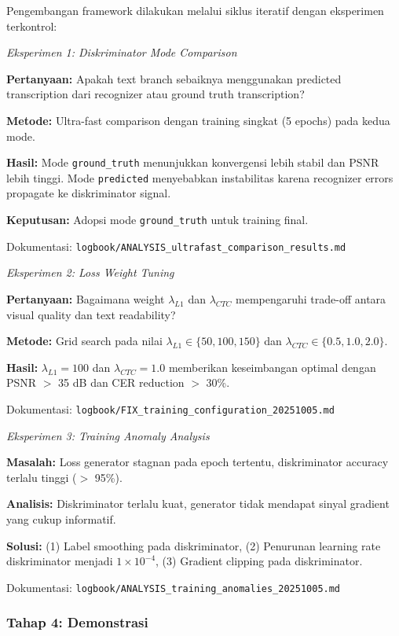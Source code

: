 \documentclass[12pt,a4paper]{article}
\begin{document}
Pengembangan framework dilakukan melalui siklus iteratif dengan eksperimen terkontrol:

\textit{Eksperimen 1: Diskriminator Mode Comparison}

\textbf{Pertanyaan:} Apakah text branch sebaiknya menggunakan predicted transcription dari recognizer atau ground truth transcription?

\textbf{Metode:} Ultra-fast comparison dengan training singkat (5 epochs) pada kedua mode.

\textbf{Hasil:} Mode \texttt{ground\_truth} menunjukkan konvergensi lebih stabil dan PSNR lebih tinggi. Mode \texttt{predicted} menyebabkan instabilitas karena recognizer errors propagate ke diskriminator signal.

\textbf{Keputusan:} Adopsi mode \texttt{ground\_truth} untuk training final.

Dokumentasi: \texttt{logbook/ANALYSIS\_ultrafast\_comparison\_results.md}

\textit{Eksperimen 2: Loss Weight Tuning}

\textbf{Pertanyaan:} Bagaimana weight $\lambda_{L1}$ dan $\lambda_{CTC}$ mempengaruhi trade-off antara visual quality dan text readability?

\textbf{Metode:} Grid search pada nilai $\lambda_{L1} \in \{50, 100, 150\}$ dan $\lambda_{CTC} \in \{0.5, 1.0, 2.0\}$.

\textbf{Hasil:} $\lambda_{L1}=100$ dan $\lambda_{CTC}=1.0$ memberikan keseimbangan optimal dengan PSNR $>$ 35 dB dan CER reduction $>$ 30\%.

Dokumentasi: \texttt{logbook/FIX\_training\_configuration\_20251005.md}

\textit{Eksperimen 3: Training Anomaly Analysis}

\textbf{Masalah:} Loss generator stagnan pada epoch tertentu, diskriminator accuracy terlalu tinggi ($>$ 95\%).

\textbf{Analisis:} Diskriminator terlalu kuat, generator tidak mendapat sinyal gradient yang cukup informatif.

\textbf{Solusi:} (1) Label smoothing pada diskriminator, (2) Penurunan learning rate diskriminator menjadi $1 \times 10^{-4}$, (3) Gradient clipping pada diskriminator.

Dokumentasi: \texttt{logbook/ANALYSIS\_training\_anomalies\_20251005.md}

\subsubsection{Tahap 4: Demonstrasi}
\label{subsubsec:demonstrasi}
\end{document}
